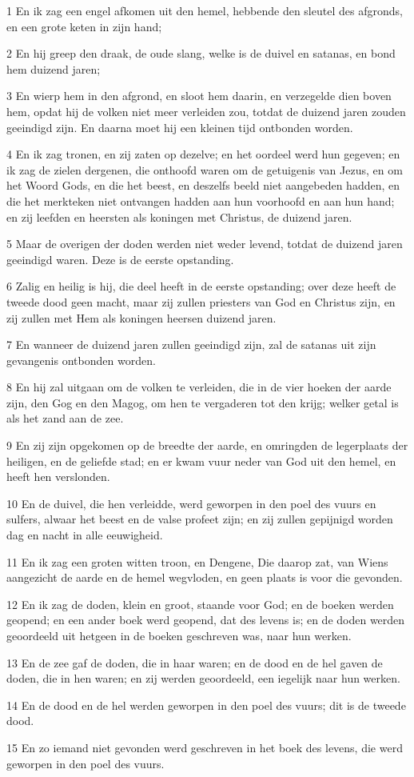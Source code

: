 \par 1 En ik zag een engel afkomen uit den hemel, hebbende den sleutel des afgronds, en een grote keten in zijn hand;
\par 2 En hij greep den draak, de oude slang, welke is de duivel en satanas, en bond hem duizend jaren;
\par 3 En wierp hem in den afgrond, en sloot hem daarin, en verzegelde dien boven hem, opdat hij de volken niet meer verleiden zou, totdat de duizend jaren zouden geeindigd zijn. En daarna moet hij een kleinen tijd ontbonden worden.
\par 4 En ik zag tronen, en zij zaten op dezelve; en het oordeel werd hun gegeven; en ik zag de zielen dergenen, die onthoofd waren om de getuigenis van Jezus, en om het Woord Gods, en die het beest, en deszelfs beeld niet aangebeden hadden, en die het merkteken niet ontvangen hadden aan hun voorhoofd en aan hun hand; en zij leefden en heersten als koningen met Christus, de duizend jaren.
\par 5 Maar de overigen der doden werden niet weder levend, totdat de duizend jaren geeindigd waren. Deze is de eerste opstanding.
\par 6 Zalig en heilig is hij, die deel heeft in de eerste opstanding; over deze heeft de tweede dood geen macht, maar zij zullen priesters van God en Christus zijn, en zij zullen met Hem als koningen heersen duizend jaren.
\par 7 En wanneer de duizend jaren zullen geeindigd zijn, zal de satanas uit zijn gevangenis ontbonden worden.
\par 8 En hij zal uitgaan om de volken te verleiden, die in de vier hoeken der aarde zijn, den Gog en den Magog, om hen te vergaderen tot den krijg; welker getal is als het zand aan de zee.
\par 9 En zij zijn opgekomen op de breedte der aarde, en omringden de legerplaats der heiligen, en de geliefde stad; en er kwam vuur neder van God uit den hemel, en heeft hen verslonden.
\par 10 En de duivel, die hen verleidde, werd geworpen in den poel des vuurs en sulfers, alwaar het beest en de valse profeet zijn; en zij zullen gepijnigd worden dag en nacht in alle eeuwigheid.
\par 11 En ik zag een groten witten troon, en Dengene, Die daarop zat, van Wiens aangezicht de aarde en de hemel wegvloden, en geen plaats is voor die gevonden.
\par 12 En ik zag de doden, klein en groot, staande voor God; en de boeken werden geopend; en een ander boek werd geopend, dat des levens is; en de doden werden geoordeeld uit hetgeen in de boeken geschreven was, naar hun werken.
\par 13 En de zee gaf de doden, die in haar waren; en de dood en de hel gaven de doden, die in hen waren; en zij werden geoordeeld, een iegelijk naar hun werken.
\par 14 En de dood en de hel werden geworpen in den poel des vuurs; dit is de tweede dood.
\par 15 En zo iemand niet gevonden werd geschreven in het boek des levens, die werd geworpen in den poel des vuurs.

